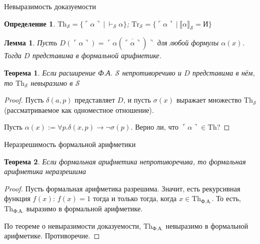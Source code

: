 \documentclass[aspectratio=169]{beamer}
\newtheorem{thm}{Теорема}[section]
\newtheorem{dfn}{Определение}[section]
\newtheorem{lmm}{Лемма}[section]
\begin{document}
\begin{frame}{Невыразимость доказуемости}
\begin{dfn}
$\text{Th}_\mathcal{S} = \{ \ulcorner\alpha\urcorner\ |\ \vdash_\mathcal{S}\alpha \}$; 
$\text{Tr}_\mathcal{S} = \{ \ulcorner\alpha\urcorner\ |\ \llbracket\alpha\rrbracket_\mathcal{S} = \text{И} \}$
\end{dfn}

\begin{lmm}Пусть $D(\ulcorner\alpha\urcorner) = \ulcorner\alpha(\overline{\ulcorner\alpha\urcorner})\urcorner$ для
любой формулы $\alpha(x)$. Тогда $D$ представима в формальной арифметике.
\end{lmm}


\begin{thm}Если расширение Ф.А. $\mathcal{S}$ непротиворечиво и $D$ представима в нём, то $\text{Th}_\mathcal{S}$ невыразимо в $\mathcal{S}$\end{thm}

\begin{proof}Пусть $\delta(a,p)$ представляет $D$, и пусть $\sigma(x)$ выражает множество $\text{Th}_\mathcal{S}$ (рассматриваемое как
одноместное отношение).

Пусть $\alpha(x) := \forall p.\delta(x,p)\rightarrow\neg\sigma(p)$. Верно ли, что $\ulcorner\alpha\urcorner\in\text{Th}$?
\end{proof}
\end{frame}

\begin{frame}{Неразрешимость формальной арифметики}
\begin{thm}Если формальная арифметика непротиворечива, то формальная арифметика неразрешима\end{thm}
\begin{proof}
Пусть формальная арифметика разрешима. 
Значит, есть рекурсивная функция $f(x)$: $f(x)=1$ тогда и только тогда, 
когда $x \in \text{Th}_\text{Ф.А.}$. То есть, $\text{Th}_\text{Ф.А.}$ выразимо в формальной арифметике.

По теореме о невыразимости доказуемости, 
$\text{Th}_\text{Ф.А.}$ невыразимо в формальной арифметике. Противоречие.
\end{proof}
\end{frame}
\end{document}
